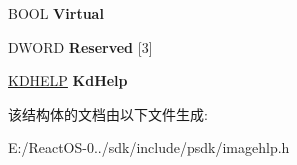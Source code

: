 \begin{DoxyCompactItemize}
\mbox{\label{struct__tag_s_t_a_c_k_f_r_a_m_e_a6b3d8cddba5f921feab6339b27f1dbca}} 
B\+O\+OL {\bfseries Virtual}
\item 
\mbox{\label{struct__tag_s_t_a_c_k_f_r_a_m_e_a17fe2b1887bda9545ffe09ba87719202}} 
D\+W\+O\+RD {\bfseries Reserved} \mbox{[}3\mbox{]}
\item 
\mbox{\label{struct__tag_s_t_a_c_k_f_r_a_m_e_a65f3eeaadd7090f7c1e30c92232109b9}} 
\hyperlink{struct___k_d_h_e_l_p}{K\+D\+H\+E\+LP} {\bfseries Kd\+Help}
\end{DoxyCompactItemize}


该结构体的文档由以下文件生成\+:\begin{DoxyCompactItemize}
\item 
E\+:/\+React\+O\+S-\/0../sdk/include/psdk/imagehlp.\+h\end{DoxyCompactItemize}
